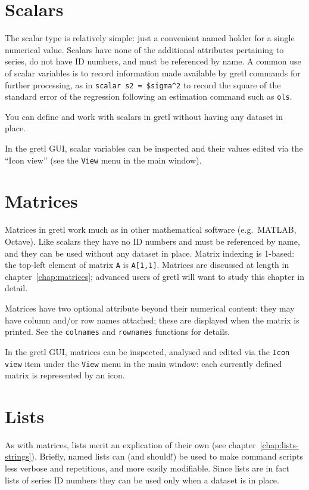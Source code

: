 \section{Scalars}
\label{sec:Scalars}

The scalar type is relatively simple: just a convenient named holder
for a single numerical value. Scalars have none of the additional
attributes pertaining to series, do not have ID numbers, and must be
referenced by name. A common use of scalar variables is to record
information made available by gretl commands for further processing,
as in \texttt{scalar s2 = \$sigma\^{}2} to record the square of the
standard error of the regression following an estimation command such
as \texttt{ols}.

You can define and work with scalars in gretl without having any
dataset in place.

In the gretl GUI, scalar variables can be inspected and their values
edited via the ``Icon view'' (see the \texttt{View} menu in the main
window).

\section{Matrices}
\label{sec:Matrices}

Matrices in gretl work much as in other mathematical software (e.g.\
\textsf{MATLAB}, \textsf{Octave}). Like scalars they have no ID
numbers and must be referenced by name, and they can be used without
any dataset in place. Matrix indexing is 1-based: the top-left element
of matrix \texttt{A} is \texttt{A[1,1]}.  Matrices are discussed at
length in chapter~\ref{chap:matrices}; advanced users of gretl will
want to study this chapter in detail.

Matrices have two optional attribute beyond their numerical content:
they may have column and/or row names attached; these are displayed
when the matrix is printed. See the \texttt{colnames} and
\texttt{rownames} functions for details.

In the gretl GUI, matrices can be inspected, analysed and edited via
the \texttt{Icon view} item under the \texttt{View} menu in the main
window: each currently defined matrix is represented by an icon.

\section{Lists}
\label{sec:Lists}

As with matrices, lists merit an explication of their own (see
chapter~\ref{chap:lists-strings}).  Briefly, named lists can (and
should!)  be used to make command scripts less verbose and
repetitious, and more easily modifiable. Since lists are in fact lists
of series ID numbers they can be used only when a dataset is in place.


